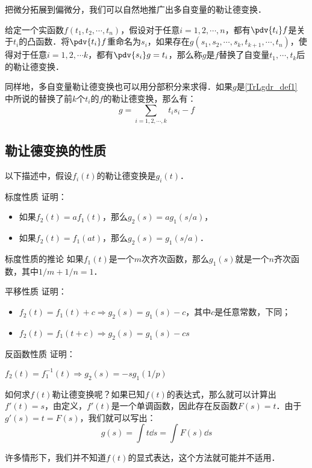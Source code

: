 把微分拓展到偏微分，我们可以自然地推广出多自变量的勒让德变换．

\begin{definition}{}\label{TrLgdr_def1}
给定一个实函数$f(t_1, t_2, \cdots, t_n)$，假设对于任意$i=1, 2, \cdots, n$，都有$\pdv{t_i}f$是关于$t_i$的凸函数．将$\pdv{t_i}f$重命名为$s_i$，如果存在$g(s_1, s_2, \cdots, s_k, t_{k+1},\cdots, t_n)$，使得对于任意$i=1,2,\cdots k$，都有$\pdv{s_i}g=t_i$，那么称$g$是$f$替换了自变量$t_1, \cdots, t_k$后的勒让德变换．
\end{definition}

同样地，多自变量勒让德变换也可以用分部积分来求得．如果$g$是\autoref{TrLgdr_def1} 中所说的替换了前$k$个$t_i$的$f$的勒让德变换，那么有：\begin{equation}\label{TrLgdr_eq1}
g=\sum\limits_{i=1,2,\cdots, k}t_is_i-f
\end{equation}

\subsection{勒让德变换的性质}

以下描述中，假设$f_i(t)$的勒让德变换是$g_i(t)$．

\begin{exercise}{标度性质}
证明：
\begin{itemize}
\item 如果$f_2(t)=af_1(t)$，那么$g_2(s)=ag_1(s/a)$，
\item 如果$f_2(t)=f_1(at)$，那么$g_2(s)=g_1(s/a)$．
\end{itemize}
\end{exercise}

\begin{corollary}{标度性质的推论}
如果$f_1(t)$是一个$m$次齐次函数，那么$g_1(s)$就是一个$n$齐次函数，其中$1/m+1/n=1$．
\end{corollary}

\begin{exercise}{平移性质}
证明：
\begin{itemize}
\item $f_2(t)=f_1(t)+c\Rightarrow g_2(s)=g_1(s)-c$，其中$c$是任意常数，下同；
\item $f_2(t)=f_1(t+c)\Rightarrow g_2(s)=g_1(s)-cs$
\end{itemize}
\end{exercise}

\begin{exercise}{反函数性质}
证明：

$f_2(t)=f_1^{-1}(t)\Rightarrow g_2(s)=-sg_1(1/p)$
\end{exercise}





如何求$f(t)$勒让德变换呢？如果已知$f(t)$的表达式，那么就可以计算出$f'(t)=s$，由定义，$f'(t)$是一个单调函数，因此存在反函数$F(s)=t$．由于$g'(s)=t=F(s)$，我们就可以写出：
\begin{equation}
g(s)=\int t \dd{s}=\int F(s) \dd{s}
\end{equation}

许多情形下，我们并不知道$f(t)$的显式表达，这个方法就可能并不适用．



